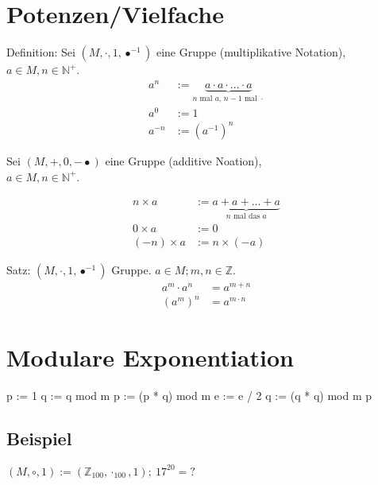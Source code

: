 \documentclass[a4paper, ngerman, landscape, fleqn]{article}
\begin{document}
\begin{multicols*}{3}
\section*{Potenzen/Vielfache}
Definition: Sei $(M, \cdot, 1, \bullet^{-1})$ eine Gruppe (multiplikative Notation), $a \in M, n \in \mathbb{N}^+$.
\begin{align*}
    a^n &:= \underbrace{a \cdot a \cdot \dotsc \cdot a}_{\text{$n$ mal $a$, $n - 1$ mal $\cdot$}} \\
    a^0 &:= 1 \\
    a^{-n} &:= \left(a^{-1}\right)^n
\end{align*}

Sei $(M, +, 0, -\bullet)$ eine Gruppe (additive Noation),\\ 
$a \in M, n \in \mathbb{N}^+$.

\begin{align*}
    n \times a &:= \underbrace{a + a + \dotsc + a}_{n \text{ mal das } a} \\
    0 \times a &:= 0 \\
    (-n) \times a &:= n \times (-a)
\end{align*}

Satz: $(M, \cdot, 1, \bullet^{-1})$ Gruppe. $a \in M; m, n \in \mathbb{Z}$.
\begin{align*}
    a^m \cdot a^n &= a^{m+n} \\
    \left(a^m\right)^n &= a^{m \cdot n} 
\end{align*}

\section*{Modulare Exponentiation}
\begin{algorithmic}
        \State p := 1
        \State q := q mod m
                \State p := (p * q) mod m
            \EndIf
            \State e := e / 2
            \State q := (q * q) mod m
        \EndWhile
        \State \Return p
    \EndFunction
\end{algorithmic}

\subsection*{Beispiel}

$(M, \circ, 1) := (\mathbb{Z}_{100}, \cdot_{100}, 1);\ 17^{20} = ?$

\vspace{1ex}


\end{multicols*}
\end{document}
